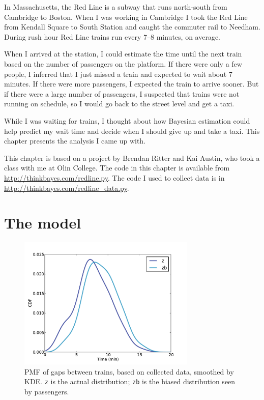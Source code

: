 \documentclass[12pt]{book}
\begin{document}
In Massachusetts, the Red Line is a subway that runs north-south from
Cambridge to Boston.  When I was working in Cambridge I took the Red
Line from Kendall Square to South Station and caught the commuter rail
to Needham.  During rush hour Red Line trains run every 7--8
minutes, on average.

When I arrived at the station, I could estimate the time until
the next train based on the number of passengers on the platform.
If there were only a few people, I inferred that I just missed
a train and expected to wait about 7 minutes.  If there were
more passengers, I expected the train to arrive sooner.  But if
there were a large number of passengers, I suspected that
trains were not running on schedule, so I would go back to the
street level and get a taxi.

While I was waiting for trains, I thought about how Bayesian
estimation could help predict my wait time and decide when I
should give up and take a taxi.  This chapter presents the
analysis I came up with.

This chapter is based on a project by Brendan Ritter and
Kai Austin, who took a class with me at Olin College.
The code in this chapter is available from
\url{http://thinkbayes.com/redline.py}.  The code I used
to collect data is in \url{http://thinkbayes.com/redline_data.py}.


\section{The model}

\begin{figure}
\centerline{\includegraphics[height=2.5in]{figs/redline0.pdf}}
\caption{PMF of gaps between trains, based on collected data,
smoothed by KDE.  {\tt z} is the actual distribution; {\tt zb}
is the biased distribution seen by passengers. }
\label{fig.redline0}
\end{figure}
\end{document}
